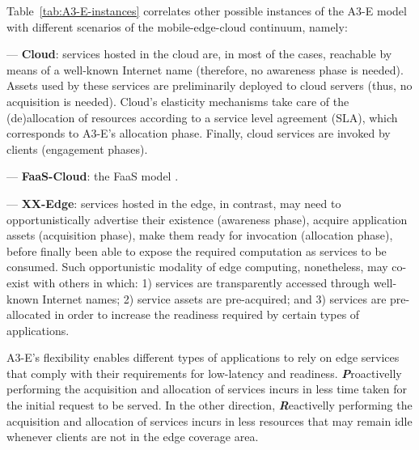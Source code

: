 

Table~\ref{tab:A3-E-instances} correlates other possible instances of the A3-E model with different scenarios of the mobile-edge-cloud continuum, namely:

--- \textbf{Cloud}: services hosted in the cloud are, in most of the cases, reachable by means of a well-known Internet name (therefore, no awareness phase is needed). Assets used by these services are preliminarily deployed to cloud servers (thus, no acquisition is needed). Cloud's elasticity mechanisms take care of the (de)allocation of resources according to a service level agreement (SLA), which corresponds to A3-E's allocation phase. Finally, cloud services are invoked by clients (engagement phases). 

--- \textbf{FaaS-Cloud}: the FaaS model . 

--- \textbf{XX-Edge}: services hosted in the edge, in contrast, may need to opportunistically advertise their existence (awareness phase), acquire application assets (acquisition phase), make them ready for invocation (allocation phase), before finally been able to expose the required computation as services to be consumed. Such opportunistic modality of edge computing, nonetheless, may co-exist with others in which: 1) services are transparently accessed through well-known Internet names; 2) service assets are pre-acquired; and 3) services are pre-allocated in order to increase the readiness required by certain types of applications. 

A3-E's flexibility enables different types of applications to rely on edge services that comply with their requirements for low-latency and readiness. \textbf{\textit{P}}roactivelly performing the acquisition and allocation of services incurs in less time taken for the initial request to be served. In the other direction, \textbf{\textit{R}}eactivelly performing the acquisition and allocation of services incurs in less resources that may remain idle whenever clients are not in the edge coverage area. 

